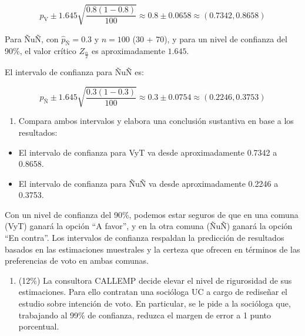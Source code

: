 \documentclass[
  letterpaper,
  DIV=11,
  numbers=noendperiod]{scrartcl}
\providecommand{\tightlist}{%
  \setlength{\itemsep}{0pt}\setlength{\parskip}{0pt}}\usepackage{longtable,booktabs,array}
\begin{document}
\[\hat{p}_{\text{V}} \pm 1.645 \sqrt{\frac{0.8(1-0.8)}{100}} \approx 0.8 \pm 0.0658 \approx (0.7342, 0.8658)\]

Para ÑuÑ, con \(\hat{p}_{\text{Ñ}} = 0.3\) y \(n = 100\) (30 + 70), y
para un nivel de confianza del 90\%, el valor crítico
\(Z_{\frac{\alpha}{2}}\) es aproximadamente \(1.645\).

El intervalo de confianza para ÑuÑ es:

\[\hat{p}_{\text{Ñ}} \pm 1.645 \sqrt{\frac{0.3(1-0.3)}{100}} \approx 0.3 \pm 0.0754 \approx (0.2246, 0.3753)\]

\begin{enumerate}
\def\labelenumi{\roman{enumi}.}
\setcounter{enumi}{2}
\tightlist
\item
  Compara ambos intervalos y elabora una conclusión sustantiva en base a
  los resultados:
\end{enumerate}

\begin{itemize}
\tightlist
\item
  El intervalo de confianza para VyT va desde aproximadamente 0.7342 a
  0.8658.
\item
  El intervalo de confianza para ÑuÑ va desde aproximadamente 0.2246 a
  0.3753.
\end{itemize}

Con un nivel de confianza del 90\%, podemos estar seguros de que en una
comuna (VyT) ganará la opción ``A favor'', y en la otra comuna (ÑuÑ)
ganará la opción ``En contra''. Los intervalos de confianza respaldan la
predicción de resultados basados en las estimaciones muestrales y la
certeza que ofrecen en términos de las preferencias de voto en ambas
comunas.

\begin{enumerate}
\def\labelenumi{\arabic{enumi}.}
\setcounter{enumi}{6}
\tightlist
\item
  (12\%) La consultora CALLEMP decide elevar el nivel de rigurosidad de
  sus estimaciones. Para ello contratan una socióloga UC a cargo de
  rediseñar el estudio sobre intención de voto. En particular, se le
  pide a la socióloga que, trabajando al 99\% de confianza, reduzca el
  margen de error a 1 punto porcentual.
\end{enumerate}
\end{document}
